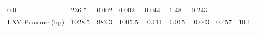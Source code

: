 \documentclass[11pt]{article}
\begin{document}
\begin{longtable}[]{@{}lllllllll@{}}
\begin{minipage}[t]{0.06\columnwidth}
0.0\strut
\end{minipage} & \begin{minipage}[t]{0.08\columnwidth}\raggedright\strut
236.5\strut
\end{minipage} & \begin{minipage}[t]{0.05\columnwidth}\raggedright\strut
0.002\strut
\end{minipage} & \begin{minipage}[t]{0.07\columnwidth}\raggedright\strut
0.002\strut
\end{minipage} & \begin{minipage}[t]{0.06\columnwidth}\raggedright\strut
0.044\strut
\end{minipage} & \begin{minipage}[t]{0.06\columnwidth}\raggedright\strut
0.48\strut
\end{minipage} & \begin{minipage}[t]{0.07\columnwidth}\raggedright\strut
0.243\strut
\end{minipage}\tabularnewline
\begin{minipage}[t]{0.25\columnwidth}\raggedright\strut
LXV Pressure (hp)\strut
\end{minipage} & \begin{minipage}[t]{0.06\columnwidth}\raggedright\strut
1028.5\strut
\end{minipage} & \begin{minipage}[t]{0.06\columnwidth}\raggedright\strut
983.3\strut
\end{minipage} & \begin{minipage}[t]{0.08\columnwidth}\raggedright\strut
1005.5\strut
\end{minipage} & \begin{minipage}[t]{0.05\columnwidth}\raggedright\strut
-0.011\strut
\end{minipage} & \begin{minipage}[t]{0.07\columnwidth}\raggedright\strut
0.015\strut
\end{minipage} & \begin{minipage}[t]{0.06\columnwidth}\raggedright\strut
-0.043\strut
\end{minipage} & \begin{minipage}[t]{0.06\columnwidth}\raggedright\strut
0.457\strut
\end{minipage} & \begin{minipage}[t]{0.07\columnwidth}\raggedright\strut
10.1\strut
\end{minipage}\tabularnewline
\begin{minipage}[t]{0.25\columnwidth}\raggedright\strut

\end{minipage}
\end{longtable}
\end{document}
